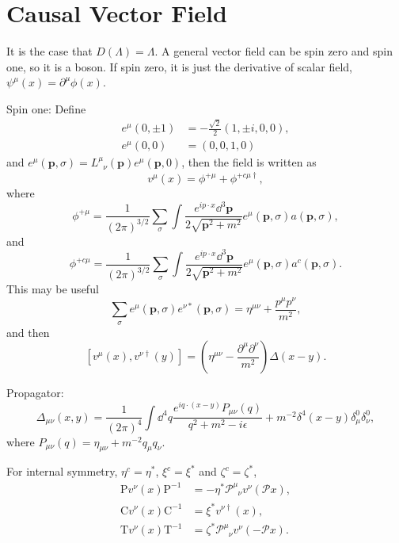 \documentclass[8pt]{book}
\begin{document}
\section{Causal Vector Field}
It is the case that $D(\Lambda)=\Lambda$. A general vector field can be spin zero and spin one, so it is a boson. If spin zero, it is just the derivative of scalar field, $\psi^\mu(x)=\partial^\mu \phi(x)$.

Spin one: Define
\[
\begin{split}
	e^\mu(0,\pm 1)&=-\frac{\sqrt{2}}{2}(1,\pm i,0,0),\\
	e^\mu(0,0)&=(0,0,1,0)
\end{split}
\]
and $e^\mu(\bm{p},\sigma)=L^\mu_{\phantom{\mu}\nu}(\bm{p})e^\mu(\bm{p},0)$, then the field is written as 
\[
	v^\mu(x)=\phi^{+\mu}+\phi^{+c\mu\dag},
\]
where
\[
	\phi^{+\mu}=\frac{1}{(2\pi)^{3/2}}\sum_{\sigma}\int \frac{e^{ip\cdot x}\dd^3\bm{p}}{2\sqrt{\bm{p}^2+m^2}}e^\mu(\bm{p},\sigma)a(\bm{p},\sigma),
\]
and
\[
	\phi^{+c\mu}=\frac{1}{(2\pi)^{3/2}}\sum_{\sigma}\int \frac{e^{ip\cdot x}\dd^3\bm{p}}{2\sqrt{\bm{p}^2+m^2}}e^\mu(\bm{p},\sigma)a^c(\bm{p},\sigma).
\]
This may be useful
\[
	\sum_{\sigma} e^\mu(\bm{p},\sigma)e^{\nu*}(\bm{p},\sigma)=\eta^{\mu\nu}+\frac{p^\mu p^\nu}{m^2},
\]
and then
\[
	[v^\mu(x),v^{\nu\dag}(y)]=\left(\eta^{\mu\nu}-\frac{\partial^\mu \partial^\nu}{m^2}\right)\Delta(x-y).
\]

Propagator:
\[
	\Delta_{\mu\nu}(x,y)=\frac{1}{(2\pi)^4}\int \dd^4q \frac{e^{iq\cdot (x-y)}P_{\mu\nu}(q)}{q^2+m^2-i\epsilon}+m^{-2}\delta^4(x-y)\delta^0_\mu \delta^0_\nu,
\]
where $P_{\mu\nu}(q)=\eta_{\mu\nu}+m^{-2}q_\mu q_\nu$.

For internal symmetry, $\eta^c=\eta^*$, $\xi^c=\xi^*$ and $\zeta^c=\zeta^*$,
\[
\begin{split}
	\mathrm{P}v^\nu(x)\mathrm{P}^{-1}&=-\eta^*\mathscr{P}^\mu_{\phantom{\mu}\nu}v^\nu(\mathscr{P}x),\\
	\mathrm{C}v^\nu(x)\mathrm{C}^{-1}&=\xi^*v^{\nu\dag}(x),\\
	\mathrm{T}v^\nu(x)\mathrm{T}^{-1}&=\zeta^*\mathscr{P}^\mu_{\phantom{\mu}\nu}v^\nu(-\mathscr{P}x).
\end{split}
\]
\end{document}
